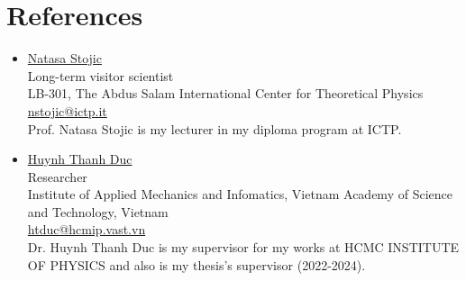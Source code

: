 \documentclass[letterpaper,11pt]{article}
\makeatletter
\newcommand{\resumeItem}[1]{
	\item\small{
		{#1 \vspace{-2pt}}
	}
}
\newcommand{\resumeOrganizationHeading}[4]{
	\vspace{-2pt}\item
	\begin{tabular*}{0.97\textwidth}[t]{l@{\extracolsep{\fill}}r}
		\textbf{#1} & \textit{\small #2} \\
		\textit{\small#3} & \textit{\small #4} 
	\end{tabular*}\vspace{-7pt}
}
\newcommand{\resumeSubItem}[1]{\resumeItem{#1}\vspace{-4pt}}
\newcommand{\resumeSubHeadingListStart}{\begin{itemize}[leftmargin=0.15in, label={}]}
\newcommand{\resumeSubHeadingListEnd}{\end{itemize}}
\makeatother
\begin{document}
	
	
	
	
	
	
	
	
\section{References}
\resumeSubHeadingListStart
\resumeSubItem{\href{https://www.ictp.it/member/natasa-stojic}{\Large Natasa Stojic\faLink}}
\\\vspace{10pt}
\hspace{0.5cm}Long-term visitor scientist\\
\hspace{0.5cm}LB-301, The Abdus Salam International Center for Theoretical Physics\\
\hspace{0.5cm}\faAt\href{mailto:nstojic@ictp.it}{\color{blue}\null \hspace{1pt} nstojic@ictp.it}
\\\hspace{0.5cm}Prof. Natasa Stojic is my lecturer in my diploma program at ICTP.
\resumeSubItem{\href{https://scholar.google.com.vn/citations?hl=en&user=EecHVyQAAAAJ&view_op=list_works&sortby=pubdate}{\Large Huynh Thanh Duc\faLink}}\\
\vspace{10pt}
\hspace{0.5cm}Researcher\\\hspace{0.5cm}Institute of Applied Mechanics and Infomatics, Vietnam Academy of Science and Technology, Vietnam \\\hspace{0.4cm}
\faAt\href{mailto:htduc@hcmip.vast.vn}{\color{blue}\null \hspace{1pt} htduc@hcmip.vast.vn}
\\\hspace{0.5cm}Dr. Huynh Thanh Duc is my supervisor for my works at HCMC INSTITUTE OF PHYSICS and also is my thesis's supervisor (2022-2024).
\resumeSubHeadingListEnd
\end{document}
